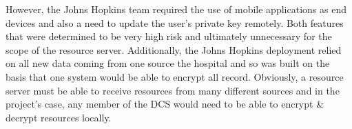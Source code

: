 However, the Johns Hopkins team required the use of mobile applications as end devices and also a need to update the user's private key remotely. Both features that were determined to be very high risk and ultimately unnecessary for the scope of the resource server. Additionally, the Johns Hopkins deployment relied on all new data coming from one source \textemdash the hospital \textemdash and so was built on the basis that one system would be able to encrypt all record. Obviously, a resource server must be able to receive resources from many different sources and in the project's case, any member of the DCS would need to be able to encrypt \& decrypt resources locally.
